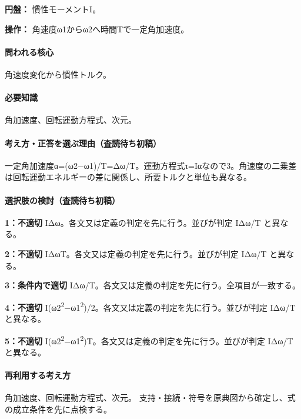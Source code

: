 \noindent\textbf{円盤：} 慣性モーメントI。\par

\noindent\textbf{操作：} 角速度ω1からω2へ時間Tで一定角加速度。\par

\paragraph{問われる核心} 角速度変化から慣性トルク。

\paragraph{必要知識} 角加速度、回転運動方程式、次元。

\paragraph{考え方・正答を選ぶ理由（査読待ち初稿）} 一定角加速度α=(ω2−ω1)/T=Δω/T。運動方程式τ=Iαなので3。角速度の二乗差は回転運動エネルギーの差に関係し、所要トルクと単位も異なる。

\paragraph{選択肢の検討（査読待ち初稿）}\mbox{}\par

\noindent\textbf{1：不適切} IΔω。各文又は定義の判定を先に行う。並びが判定 IΔω/T と異なる。\par

\noindent\textbf{2：不適切} IΔωT。各文又は定義の判定を先に行う。並びが判定 IΔω/T と異なる。\par

\noindent\textbf{3：条件内で適切} IΔω/T。各文又は定義の判定を先に行う。全項目が一致する。\par

\noindent\textbf{4：不適切} I(ω2\textsuperscript{2}−ω1\textsuperscript{2})/2。各文又は定義の判定を先に行う。並びが判定 IΔω/T と異なる。\par

\noindent\textbf{5：不適切} I(ω2\textsuperscript{2}−ω1\textsuperscript{2})T。各文又は定義の判定を先に行う。並びが判定 IΔω/T と異なる。\par

\paragraph{再利用する考え方} 角加速度、回転運動方程式、次元。 支持・接続・符号を原典図から確定し、式の成立条件を先に点検する。

